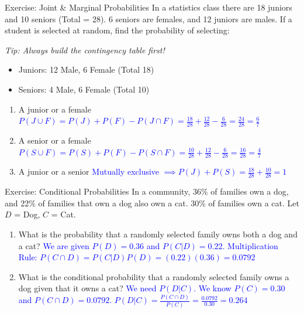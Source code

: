 \documentclass[aspectratio=169]{beamer}
\begin{document}
\begin{frame}{Exercise: Joint \& Marginal Probabilities}
    In a statistics class there are 18 juniors and 10 seniors (Total = 28). 6 seniors are females, and 12 juniors are males. If a student is selected at random, find the probability of selecting:
    
    \pause
    \textit{Tip: Always build the contingency table first!}
    \begin{itemize}
        \item Juniors: 12 Male, 6 Female (Total 18)
        \item Seniors: 4 Male, 6 Female (Total 10)
    \end{itemize}
    \pause
    
    \begin{enumerate}
        \item A junior or a female \pause
        \newline \textcolor{blue}{$P(J \cup F) = P(J) + P(F) - P(J \cap F) = \frac{18}{28} + \frac{12}{28} - \frac{6}{28} = \frac{24}{28} = \frac{6}{7}$} \pause
        
        \item A senior or a female \pause
        \newline \textcolor{blue}{$P(S \cup F) = P(S) + P(F) - P(S \cap F) = \frac{10}{28} + \frac{12}{28} - \frac{6}{28} = \frac{16}{28} = \frac{4}{7}$} \pause
        
        \item A junior or a senior \pause
        \newline \textcolor{blue}{Mutually exclusive $\implies P(J) + P(S) = \frac{18}{28} + \frac{10}{28} = 1$}
    \end{enumerate}
\end{frame}

\begin{frame}{Exercise: Conditional Probabilities}
    In a community, 36\% of families own a dog, and 22\% of families that own a dog also own a cat. 30\% of families own a cat. Let $D$ = Dog, $C$ = Cat.
    \vspace{0.2cm}
    
    \begin{enumerate}
        \item What is the probability that a randomly selected family owns both a dog and a cat? \pause
        \newline \textcolor{blue}{We are given $P(D) = 0.36$ and $P(C|D) = 0.22$.}
        \newline \textcolor{blue}{Multiplication Rule: $P(C \cap D) = P(C|D)P(D) = (0.22)(0.36) = 0.0792$} \pause
        \vspace{0.3cm}
        \item What is the conditional probability that a randomly selected family owns a dog given that it owns a cat? \pause
        \newline \textcolor{blue}{We need $P(D|C)$. We know $P(C) = 0.30$ and $P(C \cap D) = 0.0792$.}
        \newline \textcolor{blue}{$P(D|C) = \frac{P(C \cap D)}{P(C)} = \frac{0.0792}{0.30} = 0.264$}
    \end{enumerate}
\end{frame}
\end{document}
